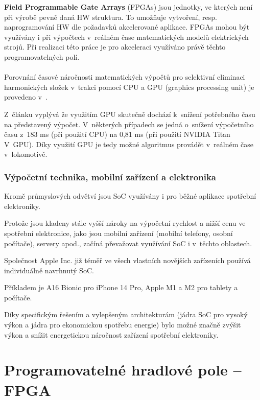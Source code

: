 \documentclass[a4paper, twoside, 11pt]{article}
\begin{document}
		\textbf{Field Programmable Gate Arrays} (FPGAs) jsou jednotky, ve kterých není při výrobě pevně daná HW struktura. To umožňuje vytvoření, resp. naprogramování HW dle požadavků akcelerované aplikace. FPGAs mohou být využívány i při výpočtech v~reálném čase matematických modelů elektrických strojů. Při realizaci této práce je pro akceleraci využíváno právě těchto programovatelných polí.\\ \\
		\noindent Porovnání časové náročnosti matematických výpočtů pro selektivní eliminaci harmonických složek v~trakci pomocí CPU a GPU (graphics processing unit) je provedeno v~\cite{ieee-selective-harmonic-elimination-nvidia}.\par
		Z~článku vyplývá že využitím GPU skutečně dochází k~snížení potřebného času na představený výpočet. V~některých případech se jedná o~snížení výpočetního času z~183 ms (při použití CPU) na 0,81 ms (při použití NVIDIA Titan V~GPU). Díky využití GPU je tedy možné algoritmus provádět v~reálném čase v~lokomotivě.

	\subsubsection{Výpočetní technika, mobilní zařízení a elektronika}
	Kromě průmyslových odvětví jsou SoC využívány i pro běžné aplikace spotřební elektroniky.\par
	Protože jsou kladeny stále vyšší nároky na výpočetní rychlost a nižší cenu ve spotřební elektronice, jako jsou mobilní zařízení (mobilní telefony, osobní počítače), servery apod., začíná převažovat využívání SoC i v~těchto oblastech.\par
	Společnost Apple Inc. již téměř ve všech vlastních novějších zařízeních používá individuálně navrhnutý SoC.\par
	Příkladem je A16 Bionic pro iPhone 14 Pro, Apple M1 a M2 pro tablety a počítače.\par
	Díky specifickým řešením a vylepšeným architekturám (jádra SoC pro vysoký výkon a jádra pro ekonomickou spotřebu energie) bylo možné značně zvýšit výkon a snížit energetickou náročnost zařízení spotřební elektroniky. \cite{apple-explore-the-new-architecture-of-apple-silicon-macs}


	\section{Programovatelné hradlové pole – FPGA}
\end{document}
